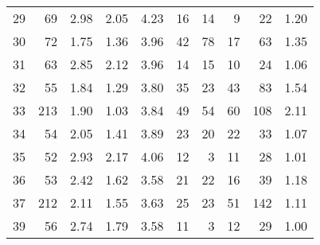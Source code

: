 \begin{tabular}{rrrrrrrrrr}
29 &       69 &                             2.98 &                             2.05 &                             4.23 &              16 &              14 &                                  9 &                              22 &       1.20 \\
30 &       72 &                             1.75 &                             1.36 &                             3.96 &              42 &              78 &                                 17 &                              63 &       1.35 \\
31 &       63 &                             2.85 &                             2.12 &                             3.96 &              14 &              15 &                                 10 &                              24 &       1.06 \\
32 &       55 &                             1.84 &                             1.29 &                             3.80 &              35 &              23 &                                 43 &                              83 &       1.54 \\
33 &      213 &                             1.90 &                             1.03 &                             3.84 &              49 &              54 &                                 60 &                             108 &       2.11 \\
34 &       54 &                             2.05 &                             1.41 &                             3.89 &              23 &              20 &                                 22 &                              33 &       1.07 \\
35 &       52 &                             2.93 &                             2.17 &                             4.06 &              12 &               3 &                                 11 &                              28 &       1.01 \\
36 &       53 &                             2.42 &                             1.62 &                             3.58 &              21 &              22 &                                 16 &                              39 &       1.18 \\
37 &      212 &                             2.11 &                             1.55 &                             3.63 &              25 &              23 &                                 51 &                             142 &       1.11 \\
39 &       56 &                             2.74 &                             1.79 &                             3.58 &              11 &               3 &                                 12 &                              29 &       1.00 \\

\end{tabular}
